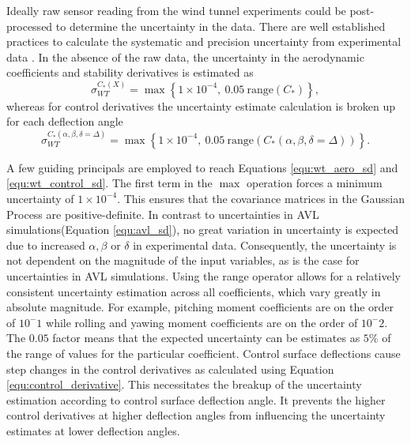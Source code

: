 Ideally raw sensor reading from the wind tunnel experiments could be post-processed to determine the uncertainty in the data.
There are well established practices to calculate the systematic and precision uncertainty from experimental data \cite{coleman1995engineering}.
In the absence of the raw data, the uncertainty in the aerodynamic coefficients and stability derivatives is estimated as 
\begin{equation}\label{equ:wt_aero_sd}
    \sigma_{WT}^{C_*(X)} = \max \left \{ 1\times 10^{-4},~0.05~\mathrm{range}(C_*) \right \},
\end{equation}
whereas for control derivatives the uncertainty estimate calculation is broken up for each deflection angle
\begin{equation} \label{equ:wt_control_sd}
    \sigma_{WT}^{C_*(\alpha,\beta,\delta=\Delta)} = \max \left \{ 1\times 10^{-4},~0.05~\mathrm{range}(C_*(\alpha,\beta,\delta=\Delta)) \right \}.
\end{equation}

A few guiding principals are employed to reach Equations \ref{equ:wt_aero_sd} and \ref{equ:wt_control_sd}.
The first term in the $\max$ operation forces a minimum uncertainty of $1\times10^{-4}$.
This ensures that the covariance matrices in the Gaussian Process are positive-definite.
In contrast to uncertainties in AVL simulations(Equation \ref{equ:avl_sd}), no great variation in uncertainty is expected due to increased $\alpha, \beta$ or $\delta$ in experimental data. 
Consequently, the uncertainty is not dependent on the magnitude of the input variables, as is the case for uncertainties in AVL simulations. 
Using the range operator allows for a relatively consistent uncertainty estimation across all coefficients, which vary greatly in absolute magnitude. 
For example, pitching moment coefficients are on the order of $10^-1$ while rolling and yawing moment coefficients are on the order of $10^-2$.
The $0.05$ factor means that the expected uncertainty can be estimates as $5\%$ of the range of values for the particular coefficient. 
Control surface deflections cause step changes in the control derivatives as calculated using Equation \ref{equ:control_derivative}.
This necessitates the breakup of the uncertainty estimation according to control surface deflection angle. 
It prevents the higher control derivatives at higher deflection angles from influencing the uncertainty estimates at lower deflection angles.

